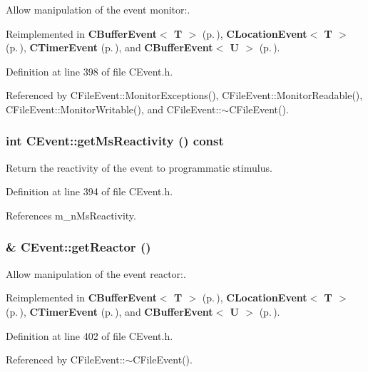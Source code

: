 Allow manipulation of the event monitor:.



Reimplemented in {\bf CBuffer\-Event$<$ T $>$} {\rm (p.\,\pageref{classCBufferEvent_a6})}, {\bf CLocation\-Event$<$ T $>$} {\rm (p.\,\pageref{classCLocationEvent_a4})}, {\bf CTimer\-Event} {\rm (p.\,\pageref{classCTimerEvent_a4})}, and {\bf CBuffer\-Event$<$ U $>$} {\rm (p.\,\pageref{classCBufferEvent_a6})}.

Definition at line 398 of file CEvent.h.

Referenced by CFile\-Event::Monitor\-Exceptions(), CFile\-Event::Monitor\-Readable(), CFile\-Event::Monitor\-Writable(), and CFile\-Event::$\sim$CFile\-Event().
\subsubsection{\setlength{\rightskip}{0pt plus 5cm}int CEvent::get\-Ms\-Reactivity () const\hspace{0.3cm}{\tt  [inline]}}\label{classCEvent_a7}


Return the reactivity of the event to programmatic stimulus.



Definition at line 394 of file CEvent.h.

References m\_\-n\-Ms\-Reactivity.
\subsubsection{\& CEvent::get\-Reactor ()\hspace{0.3cm}{\tt  [inline]}}\label{classCEvent_a9}


Allow manipulation of the event reactor:.



Reimplemented in {\bf CBuffer\-Event$<$ T $>$} {\rm (p.\,\pageref{classCBufferEvent_a7})}, {\bf CLocation\-Event$<$ T $>$} {\rm (p.\,\pageref{classCLocationEvent_a5})}, {\bf CTimer\-Event} {\rm (p.\,\pageref{classCTimerEvent_a5})}, and {\bf CBuffer\-Event$<$ U $>$} {\rm (p.\,\pageref{classCBufferEvent_a7})}.

Definition at line 402 of file CEvent.h.

Referenced by CFile\-Event::$\sim$CFile\-Event().
